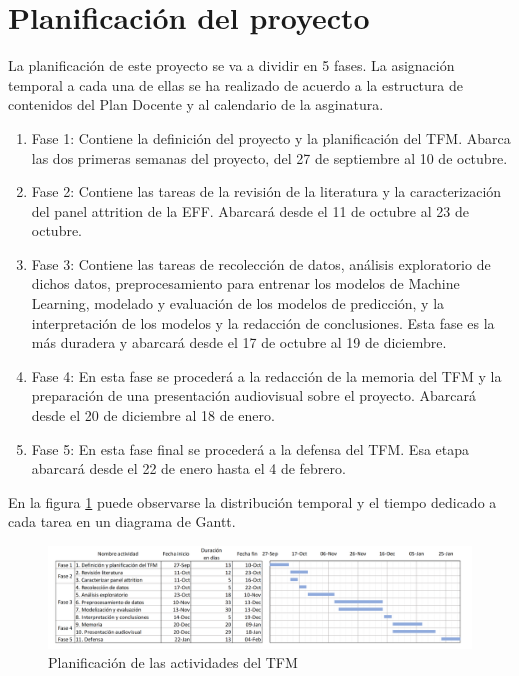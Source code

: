\section{Planificación del proyecto}

La planificación de este proyecto se va a dividir en 5 fases. La asignación temporal a cada una de ellas se ha realizado de acuerdo a la estructura de contenidos del Plan Docente y al calendario de la asginatura.

\begin{enumerate}[noitemsep]
    \item Fase 1: Contiene la definición del proyecto y la planificación del TFM. Abarca las dos primeras semanas del proyecto, del 27 de septiembre al 10 de octubre.
    \item Fase 2: Contiene las tareas de la revisión de la literatura y la caracterización del panel attrition de la EFF. Abarcará desde el 11 de octubre al 23 de octubre.
    \item Fase 3: Contiene las tareas de recolección de datos, análisis exploratorio de dichos datos, preprocesamiento para entrenar los modelos de Machine Learning, modelado y evaluación de los modelos de predicción, y la interpretación de los modelos y la redacción de conclusiones. Esta fase es la más duradera y abarcará desde el 17 de octubre al 19 de diciembre.
    \item Fase 4: En esta fase se procederá a la redacción de la memoria del TFM y la preparación de una presentación audiovisual sobre el proyecto. Abarcará desde el 20 de diciembre al 18 de enero.
    \item Fase 5: En esta fase final se procederá a la defensa del TFM. Esa etapa abarcará desde el 22 de enero hasta el 4 de febrero.
\end{enumerate}

 En la figura \ref{fig:gantt} puede observarse la distribución temporal y el tiempo dedicado a cada tarea en un diagrama de Gantt.


\begin{figure}
	\centering
	\includegraphics[width=1\textwidth]{figs/Gantt_diagram.png}
	\caption{Planificación de las actividades del TFM}
	\label{fig:gantt}
\end{figure}

